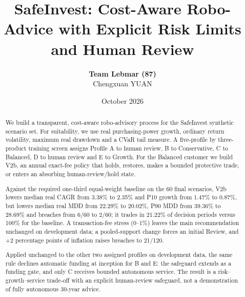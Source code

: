 \documentclass[11pt,a4paper]{article}
\title{\vspace{-8mm}\textbf{SafeInvest: Cost-Aware Robo-Advice with Explicit Risk Limits and Human Review}}
\author{\textbf{Team Lebmar (87)}\\ Chengxuan YUAN}
\date{October 2026}
\begin{document}
\maketitle
\vspace{-6mm}

\begin{abstract}
\noindent
We build a transparent, cost-aware robo-advisory process for the SafeInvest synthetic
scenario set. For suitability, we use real purchasing-power growth, ordinary
return volatility, maximum real drawdown and a CVaR tail measure. A five-profile
by three-product training screen assigns Profile A to human review, B to
Conservative, C to Balanced, D to human review and E to Growth. For the Balanced
customer we build V2b, an annual exact-fee policy that holds, restores, makes a
bounded protective trade, or enters an absorbing human-review/hold state.

\smallskip
\noindent
Against the required one-third equal-weight baseline on the 60 final scenarios,
V2b lowers median real CAGR from 3.38\% to 2.35\% and P10 growth from 1.47\% to
0.87\%, but lowers median real MDD from 22.29\% to 20.02\%, P90 MDD from 39.36\%
to 28.69\% and breaches from 6/60 to 2/60; it trades in 21.22\% of decision
periods versus 100\% for the baseline. A transaction-fee stress (0--1\%) leaves
the main recommendation unchanged on development data; a pooled-support change
forces an initial Review, and +2 percentage points of inflation raises breaches
to 21/120.

\smallskip
\noindent
Applied unchanged to the other two assigned profiles on development data, the
same rule declines automatic funding at inception for B and E: the safeguard
extends as a funding gate, and only C receives bounded autonomous service. The
result is a risk--growth--service trade-off with an explicit human-review
safeguard, not a demonstration of fully autonomous 30-year advice.
\end{abstract}
\end{document}
